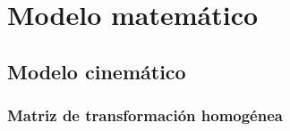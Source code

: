 \chapter{Modelo matemático}

\section{Modelo cinemático}
\subsection{Matriz de transformación homogénea}

